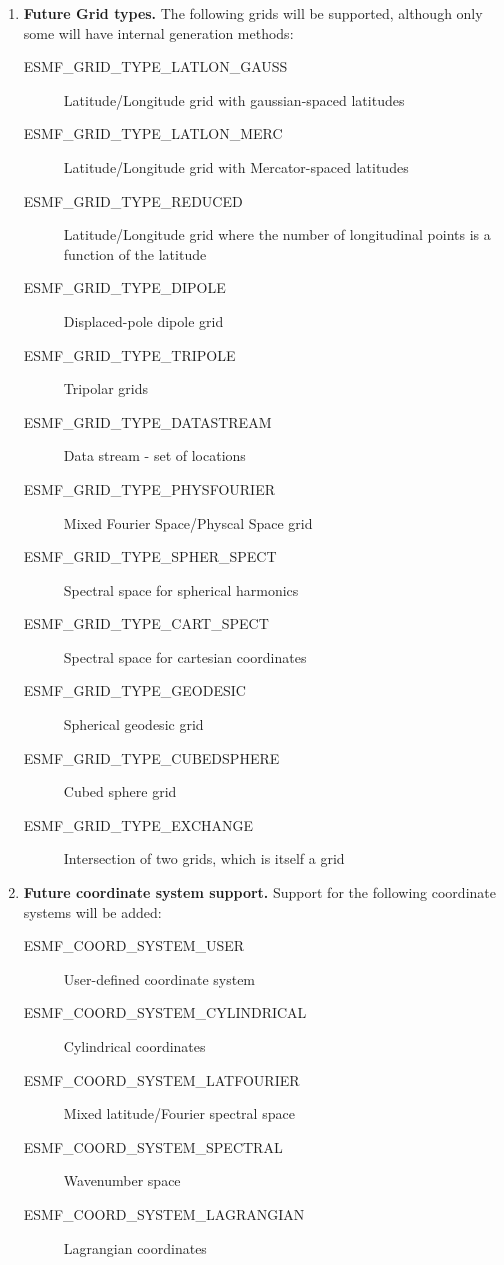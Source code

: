 \begin{enumerate}
\item {\bf Future Grid types.}  The following grids will
be supported, although only some will have internal generation 
methods:
 \begin{description}
    \item [ESMF\_GRID\_TYPE\_LATLON\_GAUSS]
          Latitude/Longitude grid with gaussian-spaced latitudes
    \item [ESMF\_GRID\_TYPE\_LATLON\_MERC]
          Latitude/Longitude grid with Mercator-spaced latitudes
    \item [ESMF\_GRID\_TYPE\_REDUCED]
          Latitude/Longitude grid where the number of longitudinal points is a
          function of the latitude
    \item [ESMF\_GRID\_TYPE\_DIPOLE]
          Displaced-pole dipole grid
    \item [ESMF\_GRID\_TYPE\_TRIPOLE]
          Tripolar grids
    \item [ESMF\_GRID\_TYPE\_DATASTREAM]
          Data stream - set of locations
    \item [ESMF\_GRID\_TYPE\_PHYSFOURIER]
          Mixed Fourier Space/Physcal Space grid
    \item [ESMF\_GRID\_TYPE\_SPHER\_SPECT]
          Spectral space for spherical harmonics
    \item [ESMF\_GRID\_TYPE\_CART\_SPECT]
          Spectral space for cartesian coordinates
    \item [ESMF\_GRID\_TYPE\_GEODESIC]
          Spherical geodesic grid
    \item [ESMF\_GRID\_TYPE\_CUBEDSPHERE]
          Cubed sphere grid
    \item [ESMF\_GRID\_TYPE\_EXCHANGE]
          Intersection of two grids, which is itself a grid
 \end{description}

\item {\bf Future coordinate system support.}  Support for the following
coordinate systems will be added:
 \begin{description}
    \item [ESMF\_COORD\_SYSTEM\_USER]
          User-defined coordinate system
    \item [ESMF\_COORD\_SYSTEM\_CYLINDRICAL]
          Cylindrical coordinates
    \item [ESMF\_COORD\_SYSTEM\_LATFOURIER]
          Mixed latitude/Fourier spectral space
    \item [ESMF\_COORD\_SYSTEM\_SPECTRAL]
          Wavenumber space
    \item [ESMF\_COORD\_SYSTEM\_LAGRANGIAN]
          Lagrangian coordinates
 \end{description}


\end{enumerate}
